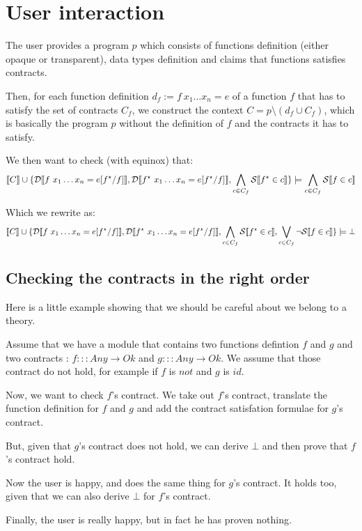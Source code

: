 \documentclass{article}
\begin{document}
\section{User interaction}

The user provides a program $p$ which consists of functions definition (either opaque or transparent), data types definition and claims that functions satisfies contracts.

Then, for each function definition $d_f := f~x_1 \dots x_n = e$ of a function $f$ that has to satisfy the set of contracts $C_f$, we construct the context $C = p \setminus ( d_f \cup C_f )$, which is basically the program $p$ without the definition of $f$ and the contracts it has to satisfy. 

We then want to check (with equinox) that:
 $$\llbracket C \rrbracket \cup \{ \mathcal{D} \llbracket f~x_1 \dots x_n = e[f^\star/f] \rrbracket, \mathcal{D} \llbracket f^\star~x_1 \dots x_n = e[f^\star/f] \rrbracket, \bigwedge_{c \in C_f} \mathcal{S} \llbracket f^\star \in c \rrbracket \} \models \bigwedge_{c \in C_f} \mathcal{S} \llbracket f \in c \rrbracket$$

Which we rewrite as:
 $$\llbracket C \rrbracket \cup \{ \mathcal{D} \llbracket f~x_1 \dots x_n = e[f^\star/f] \rrbracket, \mathcal{D} \llbracket f^\star~x_1 \dots x_n = e[f^\star/f] \rrbracket, \bigwedge_{c \in C_f} \mathcal{S} \llbracket f^\star \in c \rrbracket,  \bigvee_{c \in C_f} \lnot \mathcal{S} \llbracket f \in c \rrbracket \} \models \bot$$

\subsection{Checking the contracts in the right order}
Here is a little example showing that we should be careful about we
belong to a theory.

Assume that we have a module that contains two functions defintion $f$
and $g$ and two contracts : $f ::: Any \to Ok$ and $g ::: Any \to
Ok$. We assume that those contract do not hold, for example if $f$ is
$not$ and $g$ is $id$.

Now, we want to check $f$'s contract. We take out $f$'s contract,
translate the function definition for $f$ and $g$ and add the contract
satisfation formulae for $g$'s contract.

But, given that $g$'s contract does not hold, we can derive $\bot$ and
then prove that $f$'s contract hold.

Now the user is happy, and does the same thing for $g$'s contract. It
holds too, given that we can also derive $\bot$ for $f$'s contract.

Finally, the user is really happy, but in fact he has proven nothing.
\end{document}
